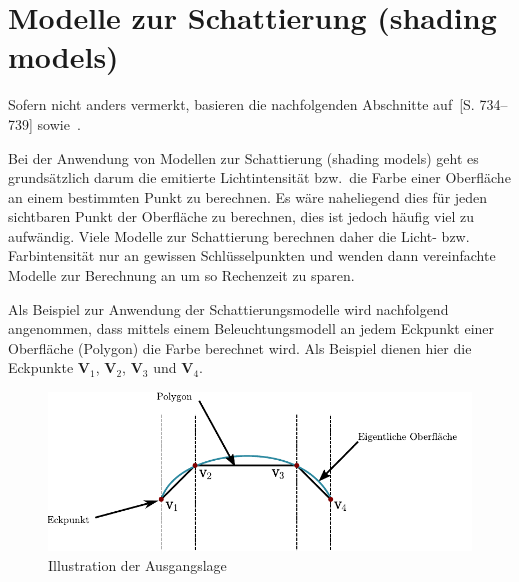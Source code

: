 
\section{Modelle zur Schattierung (shading models)}
\label{sec:shading}


Sofern nicht anders vermerkt, basieren die nachfolgenden Abschnitte
auf~\cite{foley_computer_1996}[S. 734–739] sowie~\cite{hughes_computer_2013}.

Bei der Anwendung von Modellen zur Schattierung (shading models) geht es
grundsätzlich darum die emitierte Lichtintensität bzw.\ die Farbe einer
Oberfläche an einem bestimmten Punkt zu berechnen. Es wäre naheliegend
dies für jeden sichtbaren Punkt der Oberfläche zu berechnen, dies ist
jedoch häufig viel zu aufwändig. Viele Modelle zur Schattierung
berechnen daher die Licht- bzw. Farbintensität nur an gewissen
Schlüsselpunkten und wenden dann vereinfachte Modelle zur Berechnung an
um so Rechenzeit zu sparen.

Als Beispiel zur Anwendung der Schattierungsmodelle wird nachfolgend
angenommen, dass mittels einem Beleuchtungsmodell an jedem Eckpunkt einer
Oberfläche (Polygon) die Farbe berechnet wird. Als Beispiel dienen hier die
Eckpunkte $\bm{V}_{1}$, $\bm{V}_{2}$, $\bm{V}_{3}$ und $\bm{V}_{4}$.

\begin{figure}[H]
    \centering
    \includegraphics{img/shading_mesh.pdf}
    \caption{Illustration der Ausgangslage\protect\footnotemark}\label{
        fig:shading_mesh_illustration}
\end{figure}

